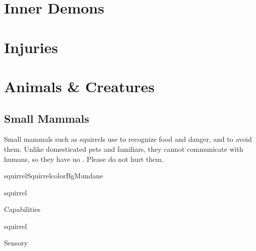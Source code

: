 \section{Inner Demons}

\section{Injuries}

\section{Animals \& Creatures}
\label{sec:animals}

\subsection{Small Mammals}


Small mammals such as squirrels use  to recognize food and danger,
and  to avoid them.
Unlike domesticated pets and familiars, they cannot communicate with
humans, so they have no .
Please do not hurt them.\\


\begin{actorCardMiniEuro}{squirrel}{Squirrel}{colorBgMundane}

	\begin{capabilitiesBox}{squirrel}
		\begin{capabilitiesTable}{Capabilities}
		\end{capabilitiesTable}
	\end{capabilitiesBox}

	\begin{speciesBonusBox}{squirrel}
		\begin{bonusTable}{Sensory}
		\end{bonusTable}
	\end{speciesBonusBox}
\end{actorCardMiniEuro}


